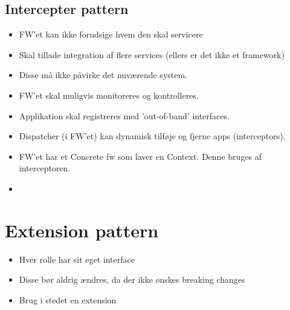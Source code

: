 \documentclass[oneside, 10pt]{memoir}
\begin{document}
\subsection*{Intercepter pattern}
\begin{itemize}
	\item FW'et kan ikke forudsige hvem den skal servicere

	\item Skal tillade integration af flere services (ellers er det ikke et framework)

	\item Disse må ikke påvirke det nuværende system.

	\item FW'et skal muligvis monitoreres og kontrolleres.

	\item Applikation skal registreres med 'out-of-band' interfaces.

	\item Dispatcher (i FW'et) kan dynamisk tilføje og fjerne apps (interceptors).

	\item FW'et har et Concrete fw som laver en Context. Denne bruges af interceptoren.

	\item 
\end{itemize}


\section*{Extension pattern}
\begin{itemize}
	\item Hver rolle har sit eget interface

	\item Disse bør aldrig ændres, da der ikke ønskes breaking changes

	\item Brug i stedet en extension
\end{itemize}






\newpage
\end{document}
